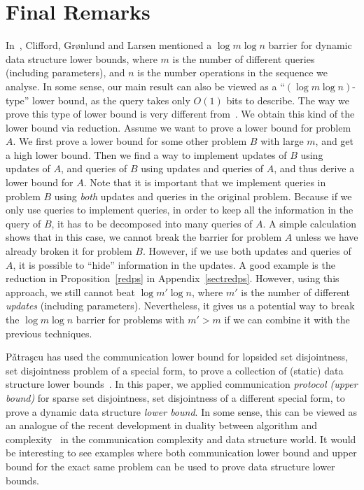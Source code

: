 \documentclass[11pt]{article}
\begin{document}
\section{Final Remarks}\label{sectremark}
In~\cite{CGL15}, Clifford, Gr\o{}nlund and Larsen mentioned a $\log m \log n$ barrier for dynamic data structure lower bounds, where $m$ is the number of different queries (including parameters), and $n$ is the number operations in the sequence we analyse. In some sense, our main result can also be viewed as a ``$(\log m\log n)$-type'' lower bound, as the query takes only $O(1)$ bits to describe. The way we prove this type of lower bound is very different from~\cite{Larsen12a, Larsen12b, CGL15}. We obtain this kind of the lower bound via reduction. Assume we want to prove a lower bound for problem $A$. We first prove a lower bound for some other problem $B$ with large $m$, and get a high lower bound. Then we find a way to implement updates of $B$ using updates of $A$, and queries of $B$ using updates and queries of $A$, and thus derive a lower bound for $A$. Note that it is important that we implement queries in problem $B$ using \emph{both} updates and queries in the original problem. Because if we only use queries to implement queries, in order to keep all the information in the query of $B$, it has to be decomposed into many queries of $A$. A simple calculation shows that in this case, we cannot break the barrier for problem $A$ unless we have already broken it for problem $B$. However, if we use both updates and queries of $A$, it is possible to ``hide'' information in the updates. A good example is the reduction in Proposition~\ref{redps} in Appendix~\ref{sectredps}. However, using this approach, we still cannot beat $\log m'\log n$, where $m'$ is the number of different \emph{updates} (including parameters). Nevertheless, it gives us a potential way to break the $\log m\log n$ barrier for problems with $m'>m$ if we can combine it with the previous techniques. 

P\v{a}tra\c{s}cu has used the communication lower bound for lopsided set disjointness, set disjointness problem of a special form, to prove a collection of (static) data structure lower bounds~\cite{Pat08, Pat11}. In this paper, we applied communication \emph{protocol (upper bound)} for sparse set disjointness, set disjointness of a different special form, to prove a dynamic data structure \emph{lower bound}. In some sense, this can be viewed as an analogue of the recent development in duality between algorithm and complexity~\cite{Williams13, Williams14, AWY15} in the communication complexity and data structure world. It would be interesting to see examples where both communication lower bound and upper bound for the exact same problem can be used to prove data structure lower bounds.
\end{document}
